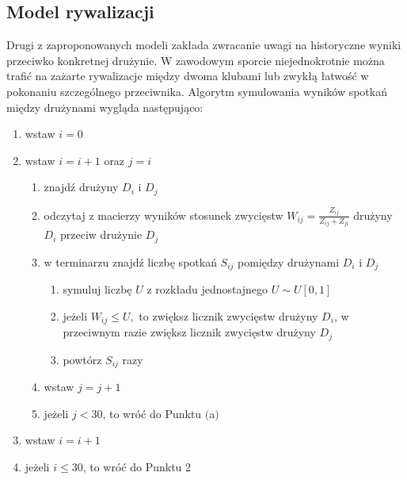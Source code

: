 \documentclass[inzynierska]{pwr_wmat_praca_dyplomowa}
\theoremstyle{plain}
\numberwithin{theorem}{chapter}
\theoremstyle{definition}
\numberwithin{theorem}{chapter}
\begin{document}
\subsection{Model rywalizacji}
Drugi z zaproponowanych modeli zakłada zwracanie uwagi na historyczne wyniki przeciwko konkretnej drużynie. W zawodowym sporcie niejednokrotnie można trafić na zażarte rywalizacje między dwoma klubami lub zwykłą łatwość w pokonaniu szczególnego przeciwnika. Algorytm symulowania wyników spotkań między drużynami wygląda następująco:
\begin{enumerate}
	\item wstaw $i=0$
	\item wstaw $i=i+1$ oraz $j=i$
	\begin{enumerate} 
		\item znajdź drużyny $D_i$ i $D_j$
		\item odczytaj z macierzy wyników stosunek zwycięstw $W_{ij}=\frac{Z_{ij}}{Z_{ij}+Z_{ji}}$ drużyny $D_i$ przeciw drużynie $D_j$   
		\item w terminarzu znajdź liczbę spotkań $S_{ij}$ pomiędzy drużynami $D_i$ i $D_j$
		\begin{enumerate}
			\item symuluj liczbę $U$ z rozkładu jednostajnego $U\sim U[0,1]$ 
			\item jeżeli $W_{ij} \leq U,$ to zwiększ licznik zwycięstw drużyny $D_i$, w przeciwnym razie zwiększ licznik zwycięstw drużyny $D_j$
			\item powtórz $S_{ij}$ razy
		\end{enumerate}
		\item wstaw $j=j+1$
		\item jeżeli $j< 30$, to wróć do Punktu $($a$)$ 
	\end{enumerate}
	\item wstaw $i=i+1$
	\item jeżeli $i\leq 30$, to wróć do Punktu 2
\end{enumerate} 
\end{document}
